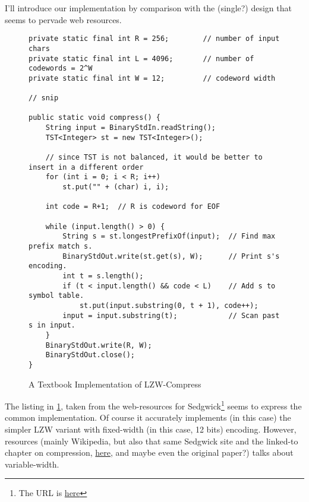 \documentclass{scrartcl}
\begin{document}
I'll introduce our implementation by comparison with the (single?) design that seems to pervade web resources.
\begin{figure}[h]
\begin{verbatim}
private static final int R = 256;        // number of input chars
private static final int L = 4096;       // number of codewords = 2^W
private static final int W = 12;         // codeword width

// snip

public static void compress() {
    String input = BinaryStdIn.readString();
    TST<Integer> st = new TST<Integer>();

    // since TST is not balanced, it would be better to insert in a different order
    for (int i = 0; i < R; i++)
        st.put("" + (char) i, i);

    int code = R+1;  // R is codeword for EOF

    while (input.length() > 0) {
        String s = st.longestPrefixOf(input);  // Find max prefix match s.
        BinaryStdOut.write(st.get(s), W);      // Print s's encoding.
        int t = s.length();
        if (t < input.length() && code < L)    // Add s to symbol table.
            st.put(input.substring(0, t + 1), code++);
        input = input.substring(t);            // Scan past s in input.
    }
    BinaryStdOut.write(R, W);
    BinaryStdOut.close();
}
\end{verbatim}
\caption{A Textbook Implementation of LZW-Compress}\label{lst:textbook-lzw-compress}
\end{figure}
The listing in \cref{lst:textbook-lzw-compress}, taken from the web-resources for Sedgwick\footnote{The URL is \href{https://algs4.cs.princeton.edu/55compression/LZW.java.html}{here}} seems to express the common implementation.
Of course it accurately implements (in this case) the simpler LZW variant with fixed-width (in this case, 12 bits) encoding.
However, resources (mainly Wikipedia, but also that same Sedgwick site and the linked-to chapter on compression, \href{https://www.cs.cmu.edu/afs/cs/project/pscico-guyb/realworld/www/compression.pdf}{here}, and maybe even the original paper?) talks about variable-width.
\end{document}
